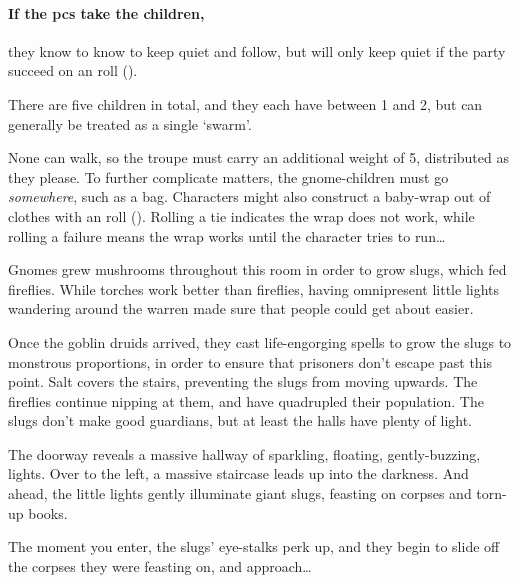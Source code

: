 \begin{multicols}{2}
\paragraph{If the \glspl{pc} take the children,}
they know to know to keep quiet and follow, but will only keep quiet if the party succeed on an  roll (\tn[10]).


There are five children in total, and they each have  between 1 and 2, but can generally be treated as a single `\gls{swarm}'.

None can walk, so the troupe must carry an additional \gls{weight} of 5, distributed as they please.
To further complicate matters, the gnome-children must go \emph{somewhere}, such as a bag.
Characters might also construct a baby-wrap out of clothes with an  roll (\tn[10]).
Rolling a tie indicates the wrap does not work, while rolling a failure means the wrap works until the character tries to run\ldots


\begin{exampletext}
Gnomes grew mushrooms throughout this room in order to grow slugs, which fed fireflies.
While torches work better than fireflies, having omnipresent little lights wandering around the \gls{warren} made sure that people could get about easier.

Once the goblin druids arrived, they cast life-engorging spells to grow the slugs to monstrous proportions, in order to ensure that prisoners don't escape past this point.
Salt covers the stairs, preventing the slugs from moving upwards.
The fireflies continue nipping at them, and have quadrupled their population.
The slugs don't make good guardians, but at least the halls have plenty of light.
\end{exampletext}

\begin{boxtext}
  The doorway reveals a massive hallway of sparkling, floating, gently-buzzing, lights.
  Over to the left, a massive staircase leads up into the darkness.
  And ahead, the little lights gently illuminate giant slugs, feasting on corpses and torn-up books.

  The moment you enter, the slugs' eye-stalks perk up, and they begin to slide off the corpses they were feasting on, and approach\ldots
\end{boxtext}


\end{multicols}
